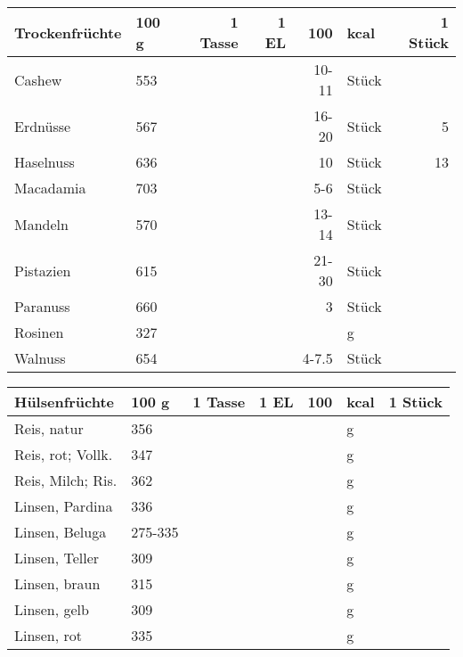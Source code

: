 \vfill

\begin{tabularx}{\linewidth}{X|l|r|r|rl|r}
Trockenfrüchte    &   100 g & 1 Tasse & 1 EL &      100 & kcal    & 1 Stück  \\
\hline
Cashew            &     553 &         &      &  10-11   & Stück   &          \\
Erdnüsse          &     567 &         &      &  16-20   & Stück   &       5  \\
Haselnuss         &     636 &         &      &     10   & Stück   &      13  \\
Macadamia         &     703 &         &      &    5-6   & Stück   &          \\
Mandeln           &     570 &         &      &  13-14   & Stück   &          \\
Pistazien         &     615 &         &      &  21-30   & Stück   &          \\
Paranuss          &     660 &         &      &      3   & Stück   &          \\
Rosinen           &     327 &         &      &          & g       &          \\
Walnuss           &     654 &         &      &    4-7.5 & Stück   &          \\
\end{tabularx}

\newpage

\begin{tabularx}{\linewidth}{X|l|r|r|rl|r}
Hülsenfrüchte     &   100 g & 1 Tasse & 1 EL &      100 & kcal    & 1 Stück  \\
\hline
Reis, natur       &     356 &         &      &          & g       &          \\
Reis, rot; Vollk. &     347 &         &      &          & g       &          \\
Reis, Milch; Ris. &     362 &         &      &          & g       &          \\
Linsen, Pardina   &     336 &         &      &          & g       &          \\
Linsen, Beluga    & 275-335 &         &      &          & g       &          \\
Linsen, Teller    &     309 &         &      &          & g       &          \\
Linsen, braun     &     315 &         &      &          & g       &          \\
Linsen, gelb      &     309 &         &      &          & g       &          \\
Linsen, rot       &     335 &         &      &          & g       &          \\
\end{tabularx}

